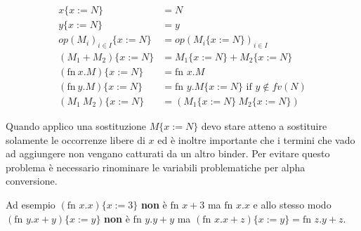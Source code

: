 \begin{align*}
	x \{x := N\} &= N \\
	y \{x := N\} &= y \\
	op(M_i)_{i \in I}\{x := N\}  &= op(M_i\{x := N\} )_{i \in I} \\
	(M_1 + M_2) \{ x:= N \} &= M_1\{x := N\} + M_2 \{x := N\} \\
	(\text{fn} \: x.M)\{x := N\} &= \text{fn }x.M \\
	(\text{fn} \: y.M)\{x := N\}  &= \text{fn }y.M\{x := N\} \text{ if } y \notin fv(N) \\
	(M_1 \: M_2) \{x := N\}  &= (M_1\{x := N\} \: M_2 \{x := N\} )
\end{align*}

Quando applico una sostituzione $M\{x := N\}$ devo stare atteno a sostituire solamente le occorrenze libere di $x$ ed è inoltre importante che i termini che vado ad aggiungere non vengano catturati da un altro binder.
Per evitare questo problema è necessario rinominare le variabili problematiche per alpha conversione.

Ad esempio $(\text{fn }x.x)\{x := 3\}$ \textbf{non} è $\text{fn }x+3 $ ma $\text{fn }x.x$ e allo stesso modo $(\text{fn }y.x+y)\{x := y\}$ \textbf{non} è $\text{fn }y.y+y$ ma $(\text{fn }x.x+z)\{x := y\} = \text{fn }z.y+z$.





